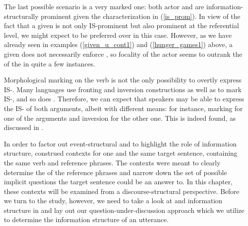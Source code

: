 \documentclass[output=paper,
,modfonts
,nonflat]{langsci/langscibook}
\begin{document}
\newpage 
{}

\noindent The last possible scenario is a very marked one: both actor and  are in\-for\-ma\-tion-struc\-tur\-al\-ly prominent given the characterization in (\ref{is_prom}). In view of the fact that a given  is not only IS-prominent but also prominent at the referential level, we might expect  to be preferred over  in this case. However, as we have already seen in examples (\ref{given_u_cont1}) and (\ref{hunger_games1}) above, a given  does not necessarily enforce , so focality of the actor seems to outrank the  of the  in quite a few instances. 


\noindent Morphological marking on the verb is not the only possibility to overtly express IS-. Many languages use fronting and inversion constructions as well as  to mark IS-, and so does . Therefore, we can expect that speakers may be able to express the IS- of both arguments, albeit with different means: for instance,  marking for one of the arguments and inversion for the other one. This is indeed found, as discussed in .

In order to factor out event-structural  and to highlight the role of information structure, \cite{latan16a} construed contexts for one and the same target sentence, containing the same verb and reference phrases. The contexts were meant to clearly determine the  of the reference phrases and narrow down the set of possible implicit questions the target sentence could be an answer to. In this chapter, these contexts will be examined from a discourse-structural perspective. Before we turn to the study, however, we need to take a look at  and information structure in  and lay out our question-under-discussion approach which we utilize to determine the information structure of an utterance.
\end{document}
